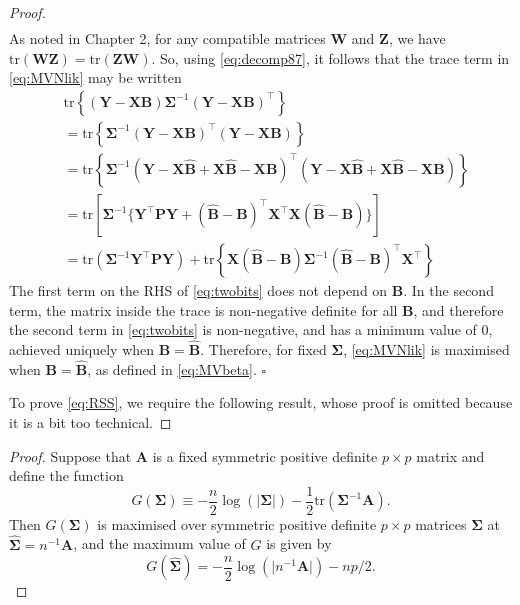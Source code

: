 \documentclass[]{book}
\theoremstyle{definition}
\theoremstyle{definition}
\theoremstyle{definition}
\theoremstyle{remark}
\begin{document}
\begin{proof}
\begin{align}
\label{eq:decomp87}
\end{align}
As noted in Chapter 2, for any compatible matrices \(\boldsymbol W\) and \(\boldsymbol Z\), we have \(\text{tr}(\boldsymbol W\boldsymbol Z)=\text{tr}(\boldsymbol Z\boldsymbol W)\). So, using \eqref{eq:decomp87}, it follows that the trace term in \eqref{eq:MVNlik} may be written
\begin{align}
&\text{tr}\left \{ (\boldsymbol Y-\boldsymbol X\boldsymbol B)\boldsymbol \Sigma^{-1} (\boldsymbol Y- \boldsymbol X\boldsymbol B)^\top \right \}\nonumber \\
&=\text{tr}\left \{\boldsymbol \Sigma^{-1} (\boldsymbol Y-\boldsymbol X\boldsymbol B)^\top (\boldsymbol Y- \boldsymbol X\boldsymbol B) \right \}\nonumber \\
&=\text{tr}\left \{  \boldsymbol \Sigma^{-1} ( \boldsymbol Y-\boldsymbol X\hat{\boldsymbol B}+\boldsymbol X\hat{\boldsymbol B} -\boldsymbol X\boldsymbol B)^\top
( \boldsymbol Y-\boldsymbol X\hat{\boldsymbol B}+\boldsymbol X\hat{\boldsymbol B} -\boldsymbol X\boldsymbol B)       \right \}\nonumber \\
&= \text{tr}\left [\boldsymbol \Sigma^{-1} \{\boldsymbol Y^\top \boldsymbol P\boldsymbol Y+(\hat{\boldsymbol B}-\boldsymbol B)^\top \boldsymbol X^\top \boldsymbol X(\hat{\boldsymbol B}-\boldsymbol B)  \}\right ]
\nonumber\\
&=\text{tr} \left (\boldsymbol \Sigma^{-1}\boldsymbol Y^\top \boldsymbol P\boldsymbol Y\right ) + \text{tr}\left \{
\boldsymbol X(\hat{\boldsymbol B}-\boldsymbol B) \boldsymbol \Sigma^{-1} (\hat{\boldsymbol B}-\boldsymbol B)^\top  \boldsymbol X^\top  \right \}
\label{eq:twobits}
\end{align}
The first term on the RHS of \eqref{eq:twobits} does not depend on \(\boldsymbol B\). In the second term, the matrix inside the trace is non-negative definite for all \(\boldsymbol B\), and therefore the second term in \eqref{eq:twobits} is non-negative, and has a minimum value of \(0\), achieved uniquely when \(\boldsymbol B=\hat{\boldsymbol B}\). Therefore, for fixed \(\boldsymbol \Sigma\), \eqref{eq:MVNlik} is maximised when \(\boldsymbol B=\hat{\boldsymbol B}\), as defined in \eqref{eq:MVbeta}. \hfill \(\square\)

To prove \eqref{eq:RSS}, we require the following result, whose proof is omitted because it is a bit too technical.
\end{proof}
\begin{proof}
{}Suppose that \(\boldsymbol A\) is a fixed symmetric positive definite \(p \times p\) matrix and define the function
\[
G(\boldsymbol \Sigma) \equiv -\frac{n}{2} \log \left (\vert \boldsymbol \Sigma\vert\right)  -\frac{1}{2}\text{tr} \left (\boldsymbol \Sigma^{-1} \boldsymbol A\right).
\]
Then \(G(\boldsymbol \Sigma)\) is maximised over symmetric positive definite \(p \times p\) matrices \(\boldsymbol \Sigma\) at
\(\hat{\boldsymbol \Sigma}=n^{-1}\boldsymbol A\), and the maximum value of \(G\) is given by
\[
G(\hat{\boldsymbol \Sigma})= -\frac{n}{2} \log \left (\vert n^{-1} \boldsymbol A\vert \right ) -np/2.
\]
\end{proof}
\end{document}
